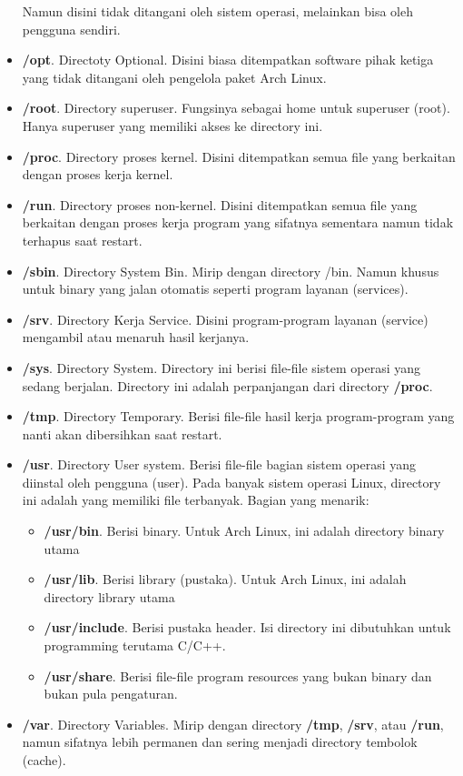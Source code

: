 \documentclass[12pt,]{article}
\begin{document}
\begin{itemize}
		Namun disini tidak ditangani oleh sistem operasi, melainkan bisa oleh pengguna sendiri.
		\item \textbf{/opt}. Directoty Optional.
		Disini biasa ditempatkan software pihak ketiga yang tidak ditangani oleh pengelola paket Arch Linux.
		\item \textbf{/root}. Directory superuser. Fungsinya sebagai home untuk superuser (root).
		Hanya superuser yang memiliki akses ke directory ini.
		\item \textbf{/proc}. Directory proses kernel. Disini ditempatkan semua file yang berkaitan dengan proses kerja kernel.
		\item \textbf{/run}. Directory proses non-kernel.
		Disini ditempatkan semua file yang berkaitan dengan proses kerja program yang sifatnya sementara namun tidak terhapus saat restart.
		\item \textbf{/sbin}. Directory System Bin. Mirip dengan directory /bin.
		Namun khusus untuk binary yang jalan otomatis seperti program layanan (services).
		\item \textbf{/srv}. Directory Kerja Service. Disini program-program layanan (service) mengambil atau menaruh hasil kerjanya.
		\item \textbf{/sys}. Directory System. Directory ini berisi file-file sistem operasi yang sedang berjalan.
		Directory ini adalah perpanjangan dari directory \textbf{/proc}.
		\item \textbf{/tmp}. Directory Temporary. Berisi file-file hasil kerja program-program yang nanti akan dibersihkan saat restart.
		\item \textbf{/usr}. Directory User system. Berisi file-file bagian sistem operasi yang diinstal oleh pengguna (user).
		Pada banyak sistem operasi Linux, directory ini adalah yang memiliki file terbanyak. Bagian yang menarik:
		\begin{itemize}
			\item \textbf{/usr/bin}. Berisi binary. Untuk Arch Linux, ini adalah directory binary utama
			\item \textbf{/usr/lib}. Berisi library (pustaka). Untuk Arch Linux, ini adalah directory library utama
			\item \textbf{/usr/include}. Berisi pustaka header. Isi directory ini dibutuhkan untuk programming terutama C/C++.
			\item \textbf{/usr/share}. Berisi file-file program resources yang bukan binary dan bukan pula pengaturan.
		\end{itemize}
		\item \textbf{/var}. Directory Variables. Mirip dengan directory \textbf{/tmp}, \textbf{/srv}, atau \textbf{/run},
		namun sifatnya lebih permanen dan sering menjadi directory tembolok (cache).
	\end{itemize}
\end{document}
